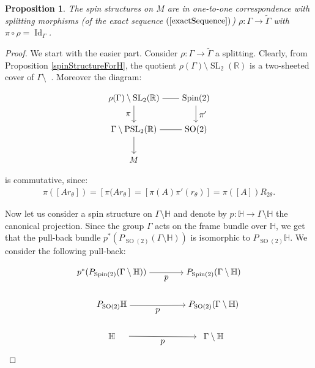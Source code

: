 \documentclass[12pt]{amsart}
\newtheorem{proposition}{Proposition}%
\theoremstyle{definition}
\def\RR{{\mathbb R}}
\def\HH{{\mathbb{H}}}
\def\G{{\Gamma}}
\DeclareMathOperator{\psl}{PSL_2(\mathbb{R})}
\newcommand{\slinear}{\operatorname{SL}}
\newcommand{\so}{\operatorname{SO}}
\newcommand{\spin}{\operatorname{Spin}}
\newcommand{\Id}{\operatorname{Id}}
\begin{document}
\begin{proposition}
The spin structures on $M$ are in one-to-one correspondence with splitting morphisms (of the exact sequence $(\ref{exactSequence})$) $\rho : \G \longrightarrow \tilde{\G}$ with $\pi\circ \rho = \Id_{\G}$.
\end{proposition}
\begin{proof}
We start with the easier part. Consider $\rho : \G \longrightarrow \tilde{\G}$ a splitting. 
Clearly, from Proposition \ref{spinStructureForH}, the quotient $\rho(\G)\setminus \slinear_2(\RR)$ is a two-sheeted cover of $\G \setminus \psl$. Moreover the diagram:
\begin{equation*}
\begin{tikzpicture}[baseline=(current  bounding  box.center)]
  \matrix (m) [matrix of math nodes,row sep=2em,column sep=2em,minimum width=2em]
  {
      \rho(\G)\setminus \slinear_2(\RR)& \spin(2) \\
      \G\setminus\psl & \so(2) \\
	    M & {} \\  
  };
  \path
    (m-1-1) edge node [ above] {} (m-1-2)
    (m-2-1)	edge node [below] {} (m-2-2);
    
    
  \path[->] 
  	(m-1-1) edge node [left]{$\pi$} (m-2-1)
  	(m-1-2)	edge node [right] {$\pi'$} (m-2-2)
  	(m-2-1) edge node [left] {} (m-3-1);
\end{tikzpicture}
\end{equation*}
is commutative, since:
\begin{align*}
\pi([Ar_{\theta}])=[\pi(Ar_{\theta}]=[\pi(A)\pi'(r_{\theta})]=\pi([A])R_{2\theta}.
\end{align*}

Now let us consider a spin structure on $\G \setminus \HH$ and denote by $p:\HH \longrightarrow \G\setminus \HH$ the canonical projection. Since the group $\G$ acts on the frame bundle over $\HH$, we get that the pull-back bundle $p^*(P_{\so(2)}(\G\setminus \HH))$ is isomorphic to $P_{\so(2)} \HH$. We consider the following pull-back:
\begin{equation}\label{diagramPullBack}
\begin{tikzpicture}[baseline=(current  bounding  box.center)]
  \matrix (m) [matrix of math nodes,row sep=2em,column sep=4em,minimum width=4em]
  {
      p^*(P_{\spin(2)}(\G\setminus \HH)) & P_{\spin(2)}(\G\setminus \HH) \\
      P_{\so(2)} \HH & P_{\so(2)}(\G\setminus \HH) \\
	    \HH & \G\setminus \HH \\  
  };
  \path[->]
    (m-1-1) edge node [below] {$p$} (m-1-2)
    (m-2-1)	edge node [below] {$p$} (m-2-2)
    (m-3-1) edge node [below] {$p$} (m-3-2);
    

\end{tikzpicture}
\end{equation}
\end{proof}
\end{document}
